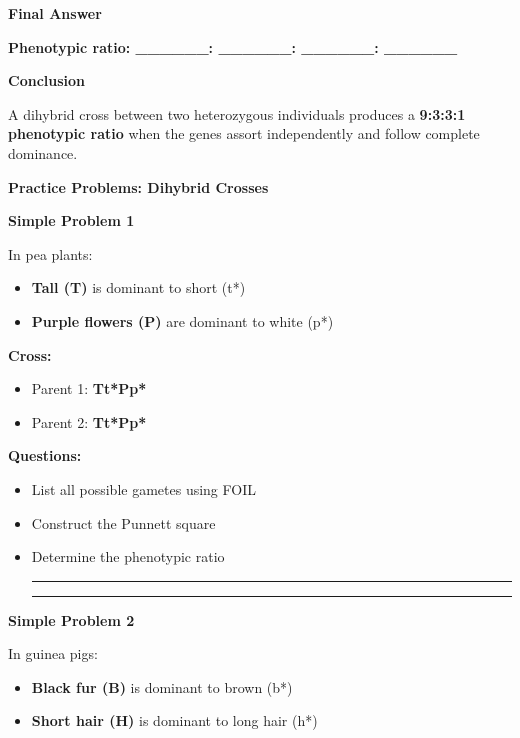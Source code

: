 \documentclass[
  letterpaper,
  DIV=11,
  numbers=noendperiod]{scrreprt}
\begin{document}
\textbf{Final Answer}

\textbf{Phenotypic ratio: \_\_\_\_\_\_: \_\_\_\_\_\_: \_\_\_\_\_\_:
\_\_\_\_\_\_}

\textbf{Conclusion}

A dihybrid cross between two heterozygous individuals produces a
\textbf{9:3:3:1 phenotypic ratio} when the genes assort independently
and follow complete dominance.

\textbf{Practice Problems: Dihybrid Crosses}

\textbf{Simple Problem 1}

In pea plants:

\begin{itemize}
\item
  \textbf{Tall (T)} is dominant to short (t*)
\item
  \textbf{Purple flowers (P)} are dominant to white (p*)
\end{itemize}

\textbf{Cross:}

\begin{itemize}
\item
  Parent 1: \textbf{Tt*Pp*}
\item
  Parent 2: \textbf{Tt*Pp*}
\end{itemize}

\textbf{Questions:}

\begin{itemize}
\item
  List all possible gametes using FOIL
\item
  Construct the Punnett square
\item
  Determine the phenotypic ratio

  \begin{center}\rule{0.5\linewidth}{0.5pt}\end{center}

  \begin{center}\rule{0.5\linewidth}{0.5pt}\end{center}
\end{itemize}

\textbf{Simple Problem 2}

In guinea pigs:

\begin{itemize}
\item
  \textbf{Black fur (B)} is dominant to brown (b*)
\item
  \textbf{Short hair (H)} is dominant to long hair (h*)
\end{itemize}
\end{document}
